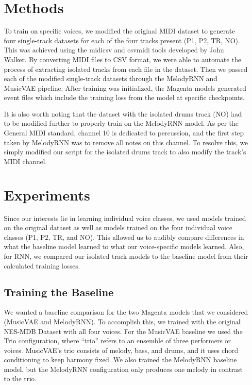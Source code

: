\documentclass{article}
\begin{document}
\section{Methods}

To train on specific voices, we modified the original MIDI dataset to generate four single-track datasets for each of the four tracks present (P1, P2, TR, NO). This was achieved using the midicsv and csvmidi tools developed by John Walker. By converting MIDI files to CSV format, we were able to automate the process of extracting isolated tracks from each file in the dataset. Then we passed each of the modified single-track datasets through the MelodyRNN and MusicVAE pipeline. After training was initialized, the Magenta models generated event files which include the training loss from the model at specific checkpoints.

It is also worth noting that the dataset with the isolated drums track (NO) had to be modified further to properly train on the MelodyRNN model. As per the General MIDI standard, channel 10 is dedicated to percussion, and the first step taken by MelodyRNN was to remove all notes on this channel. To resolve this, we simply modified our script for the isolated drums track to also modify the track’s MIDI channel.



\section{Experiments}

Since our interests lie in learning individual voice classes, we used models trained on the original dataset as well as models trained on the four individual voice classes (P1, P2, TR, and NO). This allowed us to audibly compare differences in what the baseline model learned to what our voice-specific models learned. Also, for RNN, we compared our isolated track models to the baseline model from their calculated training losses.

\subsection{Training the Baseline}
We wanted a baseline comparison for the two Magenta models that we considered (MusicVAE and MelodyRNN). To accomplish this, we trained with the original NES-MDB Dataset with all four voices. For the MusicVAE baseline we used the Trio configuration, where “trio” refers to an ensemble of three performers or voices. MusicVAE’s trio consists of melody, bass, and drums, and it uses chord conditioning to keep harmony fixed. We also trained the MelodyRNN baseline model, but the MelodyRNN configuration only produces one melody in contrast to the trio.
\end{document}

